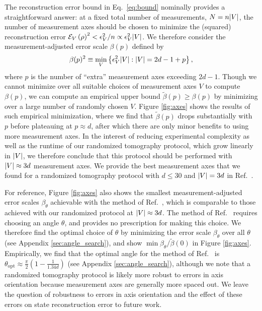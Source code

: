 \documentclass[nofootinbib,twocolumn]{revtex4-1}
\renewcommand{\t}{\text} %
\newcommand{\p}[1]{\left(#1\right)} %
\renewcommand{\Set}[1]{\left\{#1\right\}} %
\newcommand{\E}{\mathcal{E}}
\begin{document}
The reconstruction error bound in Eq.~\eqref{eq:bound} nominally provides a straightforward answer: at a fixed total number of measurements, $N=n\abs{V}$, the number of measurement axes should be chosen to minimize the (squared) reconstruction error $\E_V\p{\rho}^2<\epsilon_V^2/n\propto\epsilon_V^2\abs{V}$.
We therefore consider the measurement-adjusted error scale $\beta(p)$ defined by
\begin{align}
  \beta(p)^2
  \equiv \min_V\Set{\epsilon_V^2\abs{V}:\abs{V}=2d-1+p},
\end{align}
where $p$ is the number of ``extra'' measurement axes exceeding $2d-1$.
Though we cannot minimize over all suitable choices of measurement axes $V$ to compute $\beta(p)$, we can compute an empirical upper bound $\tilde\beta(p)\ge\beta(p)$ by minimizing over a large number of randomly chosen $V$.
Figure \ref{fig:axes} shows the results of such empirical minimization, where we find that $\tilde\beta(p)$ drops substantially with $p$ before plateauing at $p\approx d$, after which there are only minor benefits to using more measurement axes.
In the interest of reducing experimental complexity as well as the runtime of our randomized tomography protocol, which grow linearly in $\abs{V}$, we therefore conclude that this protocol should be performed with $\abs{V}\approx3d$ measurement axes.
We provide the best measurement axes that we found for a randomized tomography protocol with $d\le30$ and $\abs{V}=3d$ in Ref.~\cite{tomo_codes}.

For reference, Figure \ref{fig:axes} also shows the smallest measurement-adjusted error scales $\beta_\theta$ achievable with the method of Ref.~\cite{newton1968measurability}, which is comparable to those achieved with our randomized protocol at $\abs{V}\approx3d$.
The method of Ref.~\cite{newton1968measurability} requires choosing an angle $\theta$, and provides no prescription for making this choice.
We therefore find the optimal choice of $\theta$ by minimizing the error scale $\beta_\theta$ over all $\theta$ (see Appendix \ref{sec:angle_search}), and show $\min\beta_\theta/\tilde\beta(0)$ in Figure \ref{fig:axes}.
Empirically, we find that the optimal angle for the method of Ref.~\cite{newton1968measurability} is $\theta_{\t{opt}}\approx\frac{\pi}{2}(1 - \frac1{1.34d})$ (see Appendix \ref{sec:angle_search}), although we note that a randomized tomography protocol is likely more robust to errors in axis orientation because measurement axes are generally more spaced out.
We leave the question of robustness to errors in axis orientation and the effect of these errors on state reconstruction error to future work.
\end{document}
